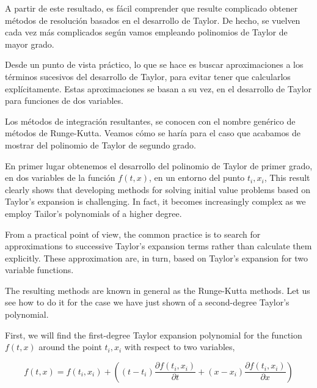 \begin{paracol}{2}
A partir de este resultado, es fácil comprender que resulte complicado obtener métodos de resolución basados en el desarrollo de Taylor. De hecho, se vuelven cada vez más complicados según vamos empleando polinomios de Taylor de mayor grado.

Desde un punto de vista práctico, lo que se hace es buscar aproximaciones a los términos sucesivos del desarrollo de Taylor, para evitar tener que calcularlos explícitamente. Estas aproximaciones se basan a su vez, en el desarrollo de Taylor para funciones de dos variables.

Los métodos de integración resultantes, se conocen con el nombre genérico de métodos de Runge-Kutta. Veamos cómo se haría para el caso que acabamos de mostrar del polinomio de Taylor de segundo grado.

En primer lugar obtenemos el desarrollo del polinomio de Taylor de primer grado, en dos variables de la función $f(t,x)$, en un entorno del punto $t_i,x_i$,
\switchcolumn
This result clearly shows that developing methods for solving initial value problems based on Taylor's expansion is challenging. In fact, it becomes increasingly complex as we employ Tailor's polynomials of a higher degree.

From a practical point of view, the common practice is to search for approximations to successive Taylor's expansion terms rather than calculate them explicitly. These approximation are, in turn, based on Taylor's expansion for two variable functions.

The resulting methods are known in general as the Runge-Kutta methods. Let us see how to do it for the case we have just shown of a second-degree Taylor's polynomial.

First, we will find the first-degree Taylor expansion polynomial for the function $f(t,x)$ around the point $t_i,x_i$ with respect to two variables,
\end{paracol}

\begin{equation*}
f(t,x)=f(t_i,x_i)+\left((t-t_i)\frac{\partial f(t_i,x_i)}{\partial t}+(x-x_i)\frac{\partial f(t_i,x_i)}{\partial x}\right)
\end{equation*}

